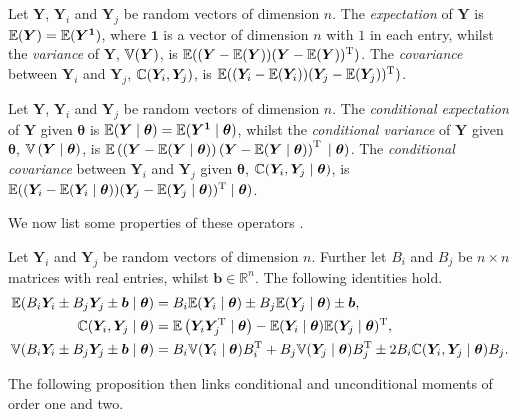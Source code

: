 \begin{definition}
Let $\bm{Y}$, $\bm{Y}_i$ and $\bm{Y}_j$ be  random vectors of dimension $n$. The \emph{expectation} of $\bm{Y}$ is $\mathbb{E}(\bm{Y})=\mathbb{E}(\bm{Y}^{\bm{1}})$,  where $\bm{1}$ is a vector of dimension $n$ with $1$ in each entry, whilst the \emph{variance} of $\bm{Y}$, $\mathbb{V}(\bm{Y})$, is $\mathbb{E}((\bm{Y}-\mathbb{E}(\bm{Y}))(\bm{Y}-\mathbb{E}(\bm{Y}))^{\textnormal{T}})$. The \emph{covariance} between $\bm{Y}_i$ and $\bm{Y}_j$, $\mathbb{C}(\bm{Y}_i,\bm{Y}_j)$, is $\mathbb{E}((\bm{Y}_i-\mathbb{E}(\bm{Y}_i))(\bm{Y}_j-\mathbb{E}(\bm{Y}_j))^{\textnormal{T}})$. 
\end{definition}

\begin{definition}
Let $\bm{Y}$, $\bm{Y}_i$ and $\bm{Y}_j$ be  random vectors of dimension $n$. The \emph{conditional expectation} of $\bm{Y}$ given $\bm{\theta}$ is $\mathbb{E}(\bm{Y}\;|\;\bm{\theta})=\mathbb{E}(\bm{Y}^{\bm{1}}\;|\;\bm{\theta})$, whilst the \emph{conditional variance} of $\bm{Y}$ given $\bm{\theta}$, $\mathbb{V}\left(\bm{Y}\;|\;\bm{\theta}\right)$, is $\mathbb{E}\left(\left(\bm{Y}-\mathbb{E}(\bm{Y}\;|\;\bm{\theta})\right)(\bm{Y}-\mathbb{E}(\bm{Y}\;|\;\bm{\theta})\right)^{\textnormal{T}}\;|\;\bm{\theta})$. The \emph{ conditional covariance} between $\bm{Y}_i$ and $\bm{Y}_j$ given $\bm{\theta}$, $\mathbb{C}(\bm{Y}_i,\bm{Y}_j\;|\;\bm{\theta})$, is $\mathbb{E}((\bm{Y}_i-\mathbb{E}(\bm{Y}_i\;|\;\bm{\theta}))(\bm{Y}_j-\mathbb{E}(\bm{Y}_j\;|\;\bm{\theta}))^{\textnormal{T}}\;|\;\bm{\theta})$.
\end{definition}
We now list some properties of these operators \citep[see e.g.][]{Casella2002}.
\begin{proposition}
\label{prop:propmom}
Let $\bm{Y}_i$ and $\bm{Y}_j$ be random vectors of dimension $n$. Further let $B_i$ and $B_j$ be $n\times n$ matrices with real entries, whilst $\bm{b}\in\mathbb{R}^n$. The following identities hold. 
\begin{align}
\mathbb{E}(B_i\bm{Y}_i\pm B_j\bm{Y}_j\pm \bm{b}\;|\;\bm{\theta})&=B_i\mathbb{E}(\bm{Y}_i\;|\;\bm{\theta})\pm B_j\mathbb{E}(\bm{Y}_j\;|\;\bm{\theta}) \pm \bm{b},\nonumber\\
\mathbb{C}(\bm{Y}_i,\bm{Y}_j\;|\;\bm{\theta})&=\mathbb{E}\left(\bm{Y}_i\bm{Y}_j^{\textnormal{T}}\;|\;\bm{\theta}\right)-\mathbb{E}(\bm{Y}_i\;|\;\bm{\theta})\mathbb{E}(\bm{Y}_j\;|\;\bm{\theta})^{\textnormal{T}},\nonumber\\
\mathbb{V}(B_i\bm{Y}_i \pm B_j\bm{Y}_j\pm \bm{b}\;|\;\bm{\theta})&=B_i\mathbb{V}(\bm{Y}_i\;|\;\bm{\theta})B_i^{\textnormal{T}}+B_j\mathbb{V}(\bm{Y}_j\;|\;\bm{\theta})B_j^{\textnormal{T}}\pm 2B_i\mathbb{C}(\bm{Y}_i,\bm{Y}_j\;|\;\bm{\theta})B_j.\nonumber
\end{align}
\end{proposition}

The following proposition then links conditional and unconditional moments of order one and two.

